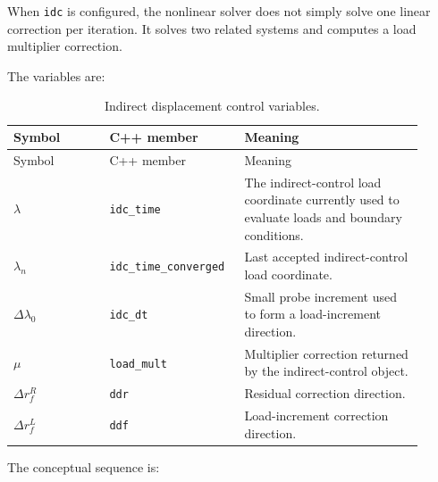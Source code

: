 \documentclass[11pt,a4paper]{article}
\newcommand{\code}[1]{\ifmmode\text{\texttt{\detokenize{#1}}}\else\nolinkurl{#1}\fi}
\begin{document}
When \code{idc} is configured, the nonlinear solver does not simply solve one
linear correction per iteration.  It solves two related systems and computes a
load multiplier correction.

The variables are:

\begin{longtable}{p{0.22\linewidth} p{0.28\linewidth} p{0.41\linewidth}}
\caption{Indirect displacement control variables.}
\label{tab:idc-vars}\\
\toprule
Symbol & C++ member & Meaning \\
\midrule
\endfirsthead
\toprule
Symbol & C++ member & Meaning \\
\midrule
\endhead
\(\lambda\) & \code{idc_time} &
The indirect-control load coordinate currently used to evaluate loads and
boundary conditions. \\

\(\lambda_n\) & \code{idc_time_converged} &
Last accepted indirect-control load coordinate. \\

\(\Delta \lambda_0\) & \code{idc_dt} &
Small probe increment used to form a load-increment direction. \\

\(\mu\) & \code{load_mult} &
Multiplier correction returned by the indirect-control object. \\

\(\Delta r_f^R\) & \code{ddr} &
Residual correction direction. \\

\(\Delta r_f^L\) & \code{ddf} &
Load-increment correction direction. \\
\bottomrule
\end{longtable}

The conceptual sequence is:
\end{document}
